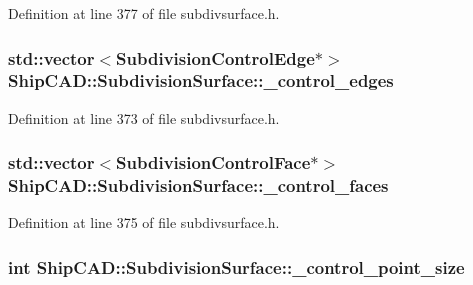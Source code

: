 Definition at line 377 of file subdivsurface.\-h.

\hypertarget{classShipCAD_1_1SubdivisionSurface_ac6b2950f05e07f5a7814b278a9dc1513}{
\subsubsection[{\-\_\-control\-\_\-edges}]{\setlength{\rightskip}{0pt plus 5cm}std\-::vector$<${\bf Subdivision\-Control\-Edge}$\ast$$>$ Ship\-C\-A\-D\-::\-Subdivision\-Surface\-::\-\_\-control\-\_\-edges\hspace{0.3cm}{\ttfamily [protected]}}}\label{classShipCAD_1_1SubdivisionSurface_ac6b2950f05e07f5a7814b278a9dc1513}


Definition at line 373 of file subdivsurface.\-h.

\hypertarget{classShipCAD_1_1SubdivisionSurface_a69c240904f61f8181a57559d4fa548c0}{
\subsubsection[{\-\_\-control\-\_\-faces}]{\setlength{\rightskip}{0pt plus 5cm}std\-::vector$<${\bf Subdivision\-Control\-Face}$\ast$$>$ Ship\-C\-A\-D\-::\-Subdivision\-Surface\-::\-\_\-control\-\_\-faces\hspace{0.3cm}{\ttfamily [protected]}}}\label{classShipCAD_1_1SubdivisionSurface_a69c240904f61f8181a57559d4fa548c0}


Definition at line 375 of file subdivsurface.\-h.

\hypertarget{classShipCAD_1_1SubdivisionSurface_a7ad820b9d312c8ecde939b5345690d35}{
\subsubsection[{\-\_\-control\-\_\-point\-\_\-size}]{\setlength{\rightskip}{0pt plus 5cm}int Ship\-C\-A\-D\-::\-Subdivision\-Surface\-::\-\_\-control\-\_\-point\-\_\-size\hspace{0.3cm}{\ttfamily [protected]}}}\label{classShipCAD_1_1SubdivisionSurface_a7ad820b9d312c8ecde939b5345690d35}


